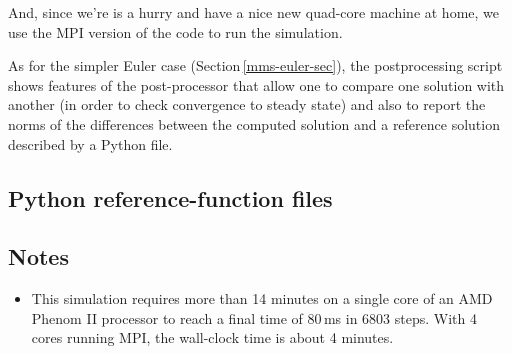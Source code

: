\noindent
And, since we're is a hurry and have a nice new quad-core machine at home,
we use the MPI version of the code to run the simulation.\\
\topbar

\bottombar

\noindent
As for the simpler Euler case (Section\,\ref{mms-euler-sec}),
the postprocessing script shows features of the post-processor that allow
one to compare one solution with another (in order to check convergence to steady state)
and also to report the norms of the differences between the computed solution and 
a reference solution described by a Python file.

\noindent
\topbar

\bottombar

\newpage
\subsection{Python reference-function files}
\topbar

\bottombar

\subsection{Notes}
\begin{itemize}
\item This simulation requires more than 14 minutes on a single core of 
  an AMD Phenom II processor to reach a final time of 80\,ms in 6803 steps.
  With 4 cores running MPI, the wall-clock time is about 4 minutes.
\end{itemize}
